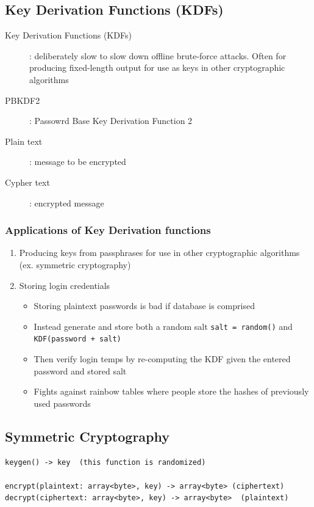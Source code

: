 \documentclass[letterpaper,12pt]{article}
\begin{document}
\subsection{Key Derivation Functions (KDFs)}
\begin{description}
 \item[Key Derivation Functions (KDFs)]: deliberately slow to slow down offline brute-force attacks. Often for producing fixed-length output for use as keys in other cryptographic algorithms
 \item[PBKDF2]: Passowrd Base Key Derivation Function 2
 \item[Plain text]: message to be encrypted
 \item[Cypher text]: encrypted message
\end{description}

\subsubsection{Applications of Key Derivation functions}
\begin{enumerate}
 \item Producing keys from passphrases for use in other cryptographic algorithms (ex. symmetric cryptography)
 \item Storing login credentials
       \begin{itemize}
        \item Storing plaintext passwords is bad if database is comprised
        \item Instead generate and store both a random salt \lstinline{salt = random()} and  \lstinline{KDF(password + salt)}
        \item Then verify login temps by re-computing the KDF given the entered password and stored salt
        \item Fights against rainbow tables where people store the hashes of previously used passwords
       \end{itemize}
\end{enumerate}

\subsection{Symmetric Cryptography}
\begin{lstlisting}
keygen() -> key  (this function is randomized)

encrypt(plaintext: array<byte>, key) -> array<byte> (ciphertext)
decrypt(ciphertext: array<byte>, key) -> array<byte>  (plaintext)
\end{lstlisting}
\end{document}
